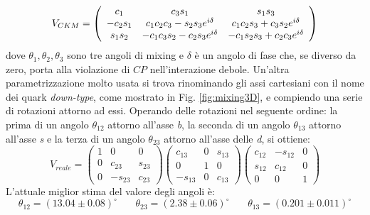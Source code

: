 \documentclass{subnucbo}
\begin{document}
\begin{equation}
V _ { C K M } = \left( \begin{array} { c c c } { c _ { 1 } } & { c _ { 3 } s _ { 1 } } & { s _ { 1 } s _ { 3 } } \\ { - c _ { 2 } s _ { 1 } } & { c _ { 1 } c _ { 2 } c _ { 3 } - s _ { 2 } s _ { 3 } e ^ { i \delta } } & { c _ { 1 } c _ { 2 } s _ { 3 } + c _ { 3 } s _ { 2 } e ^ { i \delta } } \\ { s _ { 1 } s _ { 2 } } & { - c _ { 1 } c _ { 3 } s _ { 2 } - c _ { 2 } s _ { 3 } e ^ { i \delta }} & {- c _ { 1 } s _ { 2 } s _ { 3 } + c _ { 2 } c _ { 3 } e ^ { i \delta } } \end{array} \right)
        \label{eq:ckm_param}
\end{equation}
dove $\theta _ { 1 } , \theta _ { 2 } , \theta _ { 3 }$ sono tre angoli di mixing e $\delta$ è un angolo di fase che, se diverso da zero, porta alla violazione di $CP$ nell'interazione debole. Un'altra parametrizzazione molto usata si trova rinominando gli assi cartesiani con il nome dei quark \textit{down-type}, come mostrato in Fig. \ref{fig:mixing3D}, e compiendo una serie di rotazioni attorno ad essi. Operando delle rotazioni nel seguente ordine: la prima di un angolo $\theta_{12}$ attorno all'asse \textit{b}, la seconda di un angolo $\theta_{13}$ attorno all'asse \textit{s} e la terza di un angolo $\theta_{23}$ attorno all'asse delle \textit{d}, si ottiene:
\begin{equation}
        V_{reale}=
        \begin{pmatrix}1 & 0 & 0\\0 & c_{23} & s_{23}\\0 & -s_{23} & c_{23}\end{pmatrix}
        \begin{pmatrix}c_{13} & 0 & s_{13}\\0 & 1 & 0\\-s_{13} & 0 & c_{13}\end{pmatrix}
        \begin{pmatrix}c_{12} & -s_{12} & 0\\s_{12} & c_{12} & 0\\0 & 0 & 1\end{pmatrix}
        \label{eq:CKMsencos}
\end{equation}
L'attuale miglior stima del valore degli angoli è:
\begin{equation}
        \theta_{12}=(13.04\pm0.08)^{\circ}\,\,\,\,\,\,\,\,\,\,\,\theta_{23}=(2.38\pm0.06)^{\circ}\,\,\,\,\,\,\,\,\,\,\,\theta_{13}=(0.201\pm0.011)^{\circ}
\end{equation}
\end{document}
